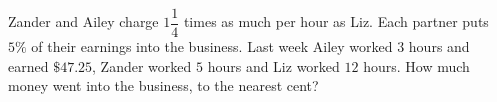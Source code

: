 Zander and Ailey charge $1\dfrac14$ times as much per hour as Liz. Each partner puts $5\%$ of their earnings into the business. Last week Ailey worked $3$ hours and earned $\$47.25$, Zander worked $5$ hours and Liz worked $12$ hours. How much money went into the business, to the nearest cent?
